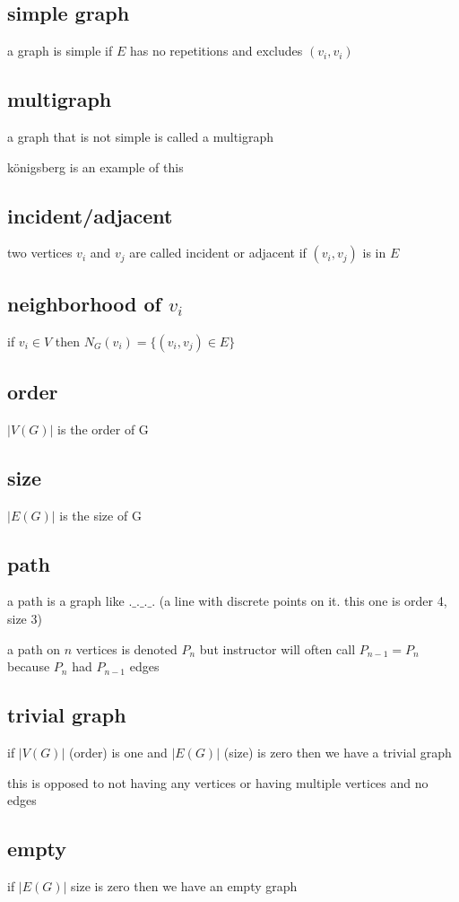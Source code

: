 \documentclass[letterpaper]{article}
\begin{document}
\subsection*{simple graph}
a graph is simple if $E$ has no repetitions and excludes $(v_i,v_i)$
\subsection*{multigraph}
a graph that is not simple is called a multigraph

königsberg is an example of this
\subsection*{incident/adjacent}
two vertices $v_i$ and $v_j$ are called incident or adjacent if $(v_i,v_j)$ is in $E$
\subsection*{neighborhood of $v_i$}
if $v_i\in V$ then $N_G(v_i)=\{(v_i,v_j)\in E\}$
\subsection*{order}
$|V(G)|$ is the order of G
\subsection*{size}
$|E(G)|$ is the size of G
\subsection*{path}
a path is a graph like $.\_.\_.\_.$ (a line with discrete points on it. this one is order 4, size 3)

a path on $n$ vertices is denoted $P_n$ but instructor will often call $P_{n-1}=P_n$ because $P_n$ had $P_{n-1}$ edges

\subsection*{trivial graph}
if $|V(G)|$ (order) is one and $|E(G)|$ (size) is zero then we have a trivial graph

this is opposed to not having any vertices or having multiple vertices and no edges

\subsection*{empty}
if $|E(G)|$ size is zero then we have an empty  graph
\end{document}
